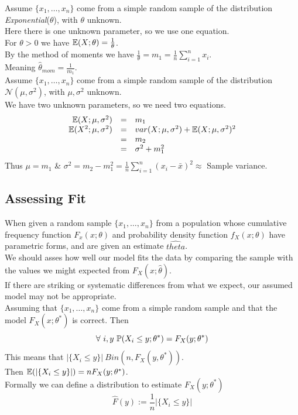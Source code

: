 \documentclass[11pt,a4paper]{article}
\begin{document}
Assume $\{x_1,\dots,x_n\}$ come from a simple random sample of the distribution \textit{Exponential}($\theta$), with $\theta$ unknown.\\
Here there is one unknown parameter, so we use one equation.\\
For $\theta>0$ we have $\mathbb{E}(X;\theta)=\frac{1}{\theta}$.\\
By the method of moments we have $\frac{1}{\theta}=m_1=\frac{1}{n}\sum\limits_{i=1}^nx_i$.\\
Meaning $\hat{\theta}_{mom}=\frac{1}{m_1}$.\\

Assume $\{x_1,\dots,x_n\}$ come from a simple random sample of the distribution $\mathcal{N}(\mu,\sigma^2)$, with $\mu,\sigma^2$ unknown.\\
We have two unknown parameters, so we need two equations.
\[\begin{array}{rcl}
\mathbb{E}(X;\mu,\sigma^2)&=&m_1\\
\mathbb{E}(X^2;\mu,\sigma^2)&=&var(X;\mu,\sigma^2)+\mathbb{E}(X;\mu,\sigma^2)^2\\
&=&m_2\\
&=&\sigma^2+m_1^2
\end{array}\]
Thus $\mu=m_1$ \& $\sigma^2=m_2-m_1^2=\frac{1}{n}\sum\limits_{i=1}^n(x_i-\bar{x})^2\approx$ Sample variance.\\

\subsection{Assessing Fit}

When given a random sample $\{x_1,\dots,x_n\}$ from a population whose cumulative frequency function $F_x(x;\theta)$ and probability density function $f_X(x;\theta)$ have parametric forms, and are given an estimate $\hat{theta}$.\\
We should asses how well our model fits the data by comparing the sample with the values we might expected from $F_X(x;\hat{\theta})$.\\
If there are striking or systematic differences from what we expect, our assumed model may not be appropriate.\\

Assuming that $\{x_1,\dots,x_n\}$ come from a simple random sample and that the model $F_X(x;\theta^*)$ is correct. Then
$$\forall\ i,y\ \prob(X_i\leq y;\theta^*)=F_X(y;\theta^*)$$
This means that $|\{X_i\leq y\}|~Bin(n,F_X(y,\theta^*))$.\\
Then $\mathbb{E}(|\{X_i\leq y\}|)=nF_X(y;\theta^*)$.\\
Formally we can define a distribution to estimate $F_X(y;\theta^*)$
$$\hat{F}(y):=\frac{1}{n}|\{X_i\leq y\}|$$
\end{document}
